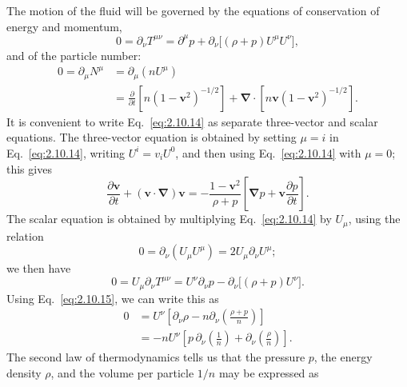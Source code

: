 The motion of the fluid will be governed by the equations of conservation of
energy and momentum,
\begin{equation}
  0=\partial_\nu T^{\mu\nu}
  =\partial^\mu p
   +\partial_\nu\bigl[(\rho+p)U^\mu U^\nu\bigr],
  \tag{2.10.14}\label{eq:2.10.14}
\end{equation}
and of the particle number:
\begin{equation}
\begin{aligned}
  0=\partial_\mu N^\mu
  &=\partial_\mu(nU^\mu)\\
  &=\frac{\partial}{\partial t}
    \left[n(1-\mathbf v^2)^{-1/2}\right]
   +\boldsymbol{\nabla}\cdot
    \left[n\mathbf v(1-\mathbf v^2)^{-1/2}\right].
\end{aligned}
  \tag{2.10.15}\label{eq:2.10.15}
\end{equation}
It is convenient to write Eq.~\eqref{eq:2.10.14} as separate three-vector and
scalar equations. The three-vector equation is obtained by setting \(\mu=i\)
in Eq.~\eqref{eq:2.10.14}, writing \(U^i=v_iU^0\), and then using
Eq.~\eqref{eq:2.10.14} with \(\mu=0\); this gives
\begin{equation}
  \frac{\partial\mathbf v}{\partial t}
  +(\mathbf v\cdot\boldsymbol{\nabla})\mathbf v
  =-\frac{1-\mathbf v^2}{\rho+p}
  \left[
    \boldsymbol{\nabla}p
    +\mathbf v\frac{\partial p}{\partial t}
  \right].
  \tag{2.10.16}\label{eq:2.10.16}
\end{equation}
The scalar equation is obtained by multiplying Eq.~\eqref{eq:2.10.14} by
\(U_\mu\), using the relation
\begin{equation}
  0=\partial_\nu(U_\mu U^\mu)
  =2U_\mu\partial_\nu U^\mu ;
  \tag{2.10.17}\label{eq:2.10.17}
\end{equation}
we then have
\[
  0=U_\mu\partial_\nu T^{\mu\nu}
  =U^\nu\partial_\nu p
   -\partial_\nu\bigl[(\rho+p)U^\nu\bigr].
\]
Using Eq.~\eqref{eq:2.10.15}, we can write this as
\begin{equation}
\begin{aligned}
  0
  &=U^\nu\left[
      \partial_\nu\rho
      -n\partial_\nu\left(\frac{\rho+p}{n}\right)
    \right]\\
  &=-nU^\nu\left[
      p\,\partial_\nu\left(\frac1n\right)
      +\partial_\nu\left(\frac{\rho}{n}\right)
    \right].
\end{aligned}
  \tag{2.10.17a}\label{eq:2.10.17a}
\end{equation}
The second law of thermodynamics tells us that the pressure \(p\), the energy
density \(\rho\), and the volume per particle \(1/n\) may be expressed as
